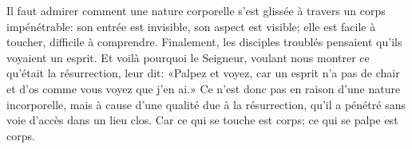 Il faut admirer comment une nature corporelle
	s’est glissée à travers un corps impénétrable:
	son entrée est invisible, son aspect est visible;
	elle est facile à toucher, difficile à comprendre.
Finalement, les disciples troublés pensaient qu’ils voyaient un esprit.
Et voilà pourquoi le Seigneur,
	voulant nous montrer ce qu’était la résurrection,
	leur dit: «Palpez et voyez,
	car un esprit n’a pas de chair et d’os comme vous voyez que j’en ai.»
Ce n’est donc pas en raison d’une nature incorporelle,
	mais à cause d’une qualité due à la résurrection,
	qu’il a pénétré sans voie d’accès dans un lieu clos.
Car ce qui se touche est corps;
	ce qui se palpe est corps.

